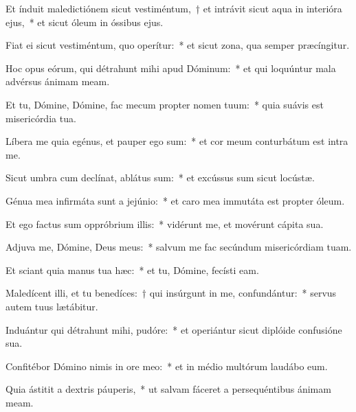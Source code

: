 \item Et índuit maledictiónem sicut vestiméntum,~† et intrávit sicut aqua in interióra ejus,~* et sicut óleum in óssibus ejus.

\item Fiat ei sicut vestiméntum, quo operítur:~* et sicut zona, qua semper præcíngitur.

\item Hoc opus eórum, qui détrahunt mihi apud Dóminum:~* et qui loquúntur mala advérsus ánimam meam.

\item Et tu, Dómine, Dómine, fac mecum propter nomen tuum:~* quia suávis est misericórdia tua.

\item Líbera me quia egénus, et pauper ego sum:~* et cor meum conturbátum est intra me.

\item Sicut umbra cum declínat, ablátus sum:~* et excússus sum sicut locústæ.

\item Génua mea infirmáta sunt a jejúnio:~* et caro mea immutáta est propter óleum.

\item Et ego factus sum oppróbrium illis:~* vidérunt me, et movérunt cápita sua.

\item Adjuva me, Dómine, Deus meus:~* salvum me fac secúndum misericórdiam tuam.

\item Et sciant quia manus tua hæc:~* et tu, Dómine, fecísti eam.

\item Maledícent illi, et tu benedíces:~† qui insúrgunt in me, confundántur:~* servus autem tuus lætábitur.

\item Induántur qui détrahunt mihi, pudóre:~* et operiántur sicut diplóide confusióne sua.

\item Confitébor Dómino nimis in ore meo:~* et in médio multórum laudábo eum.

\item Quia ástitit a dextris páuperis,~* ut salvam fáceret a persequéntibus ánimam meam.
